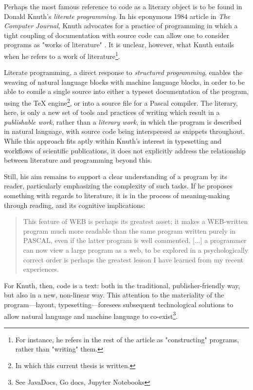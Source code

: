 Perhaps the most famous reference to code as a literary object is to be found in Donald Knuth's \emph{literate programming}. In his eponymous 1984 article in \emph{The Computer Journal}, Knuth advocates for a practice of programming in which a tight coupling of documentation with source code can allow one to consider programs as "works of literature" \citep{knuth_literate_1984}. It is unclear, however, what Knuth entails when he refers to a work of literature\footnote{For instance, he refers in the rest of the article as "constructing" programs, rather than "writing" them.}.

Literate programming, a direct response to \emph{structured programming}, enables the weaving of natural language blocks with machine language blocks, in order to be able to comile a single source into either a typeset documentation of the program, using the TeX engine\footnote{In which this current thesis is written.}, or into a source file for a Pascal compiler. The literary, here, is only a new set of tools and practices of writing which result in a \emph{publishable work}, rather than a \emph{literary work}, in which the program is described in natural language, with source code being interspersed as snippets throughout. While this approach fits aptly within Knuth's interest in typesetting and workflows of scientific publications, it does not explicitly address the relationship between literature and programming beyond this.

Still, his aim remains to support a clear understanding of a program by its reader, particularly emphasizing the complexity of such tasks. If he proposes something with regards to literature, it is in the process of meaning-making through reading, and its cognitive implications:

\begin{quote}
  This feature of WEB is perhaps its greatest asset; it makes a WEB-written program much more readable than the same program written purely in PASCAL, even if the latter program is well commented.  [...] a programmer can now view a large program as a web, to be explored in a psychologically correct order is perhaps the greatest lesson I have learned from my recent experiences. \citep{knuth_literate_1984}
\end{quote}

For Knuth, then, code is a text: both in the traditional, publisher-friendly way, but also in a new, non-linear way. This attention to the materiality of the program—layout, typesetting—foresees subsequent technological solutions to allow natural language and machine language to co-exist\footnote{See JavaDocs, Go docs, Jupyter Notebooks}.

